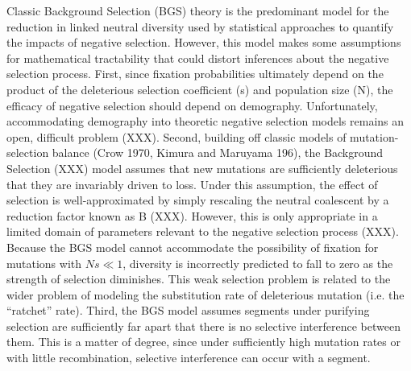 \documentclass[11pt]{article}
\begin{document}
Classic Background Selection (BGS) theory is the predominant model for the
reduction in linked neutral diversity used by statistical approaches to
quantify the impacts of negative selection. However, this model makes some
assumptions for mathematical tractability that could distort inferences about
the negative selection process. First, since fixation probabilities ultimately
depend on the product of the deleterious selection coefficient (s) and
population size (N), the efficacy of negative selection should depend on
demography. Unfortunately, accommodating demography into theoretic negative
selection models remains an open, difficult problem (XXX). Second, building off
classic models of mutation-selection balance (Crow 1970, Kimura and Maruyama
196), the Background Selection (XXX) model assumes that new mutations are
sufficiently deleterious that they are invariably driven to loss. Under this
assumption, the effect of selection is well-approximated by simply rescaling
the neutral coalescent by a reduction factor known as B (XXX). However, this is
only appropriate in a limited domain of parameters relevant to the negative
selection process (XXX). Because the BGS model cannot accommodate the
possibility of fixation for mutations with $Ns \ll 1$, diversity is incorrectly
predicted to fall to zero as the strength of selection diminishes. This weak
selection problem is related to the wider problem of modeling the substitution
rate of deleterious mutation (i.e. the “ratchet” rate). Third, the BGS model
assumes segments under purifying selection are sufficiently far apart that
there is no selective interference between them. This is a matter of degree,
since under sufficiently high mutation rates or with little recombination,
selective interference can occur with a segment. 
\end{document}
